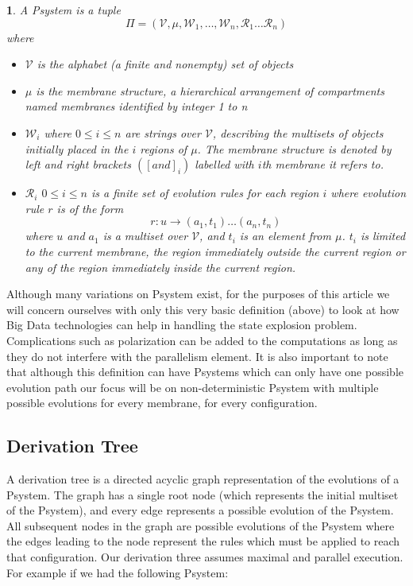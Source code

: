 \documentclass[runningheads]{llncs}
\newtheorem{defn}{\sc{Definition}}[subsection]
\begin{document}
\begin{defn}
A Psystem is a tuple
\begin{equation*}
    \Pi=(\mathcal{V}, \mu, \mathcal{W}_1,\ldots  , \mathcal{W}_n, \mathcal{R}_1 \ldots \mathcal{R}_n )
\end{equation*}
where
\begin{itemize}
  \item $\mathcal{V}$ is the alphabet (a finite and nonempty) set of objects 
  \item $\mu$ is the membrane structure, a hierarchical arrangement of compartments named membranes identified by integer 1 to n
  \item $\mathcal{W}_i$ where $0 \le i \le n$  are strings over $\mathcal{V}$, describing the multisets of objects initially placed in the $i$ regions of $\mu$. The membrane structure is denoted by left and right brackets $([ and ]_i)$ labelled with $i$th membrane it refers to.
  \item $\mathcal{R}_i$ $0 \le i \le n$ is a finite set of evolution rules for each region $i$ where evolution rule $r$ is of the form
      \begin{equation}
        r :u \rightarrow (a_1,t_1) \ldots (a_n,t_n)
      \end{equation}
      where $u$ and $a_1$ is a multiset over $\mathcal{V}$, and $t_i$ is an element from $\mu$. $t_i$ is limited to the current membrane, the region immediately outside the current region or any of the region immediately inside the current region.      
\end{itemize}
\end{defn}

Although many variations on Psystem exist, for the purposes of this article we will concern ourselves with only this very basic definition (above) to look at how Big Data technologies can help in handling the state explosion problem. Complications such as polarization can be added to the computations as long as they do not interfere with the parallelism element. It is also important to note that although this definition can have Psystems which can only have one possible evolution path our focus will be on non-deterministic Psystem with multiple possible evolutions for every membrane, for every configuration.  

\subsection{Derivation Tree}

A derivation tree is a directed acyclic graph representation of the evolutions of a Psystem. The graph has a single root node (which represents the initial multiset of the Psystem), and every edge represents a possible evolution of the Psystem. All subsequent nodes in the graph are possible evolutions of the Psystem where the edges leading to the node represent the rules which must be applied to reach that configuration. Our derivation three assumes maximal and parallel execution. For example if we had the following Psystem:\\
\end{document}
